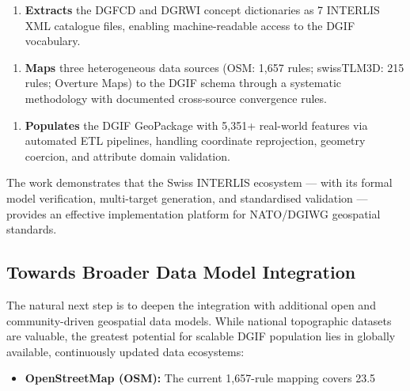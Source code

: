 \documentclass[conference]{IEEEtran}
\begin{document}
\begin{enumerate}[leftmargin=*]
\item \textbf{Extracts} the DGFCD and DGRWI concept dictionaries as 7 INTERLIS XML catalogue files, enabling machine-readable access to the DGIF vocabulary.
\end{enumerate}

\begin{enumerate}[leftmargin=*]
\item \textbf{Maps} three heterogeneous data sources (OSM: 1,657 rules; swissTLM3D: 215 rules; Overture Maps) to the DGIF schema through a systematic methodology with documented cross-source convergence rules.
\end{enumerate}

\begin{enumerate}[leftmargin=*]
\item \textbf{Populates} the DGIF GeoPackage with 5,351+ real-world features via automated ETL pipelines, handling coordinate reprojection, geometry coercion, and attribute domain validation.
\end{enumerate}

The work demonstrates that the Swiss INTERLIS ecosystem — with its formal model verification, multi-target generation, and standardised validation — provides an effective implementation platform for NATO/DGIWG geospatial standards.

\subsection{Towards Broader Data Model Integration}

The natural next step is to deepen the integration with additional open and community-driven geospatial data models. While national topographic datasets are valuable, the greatest potential for scalable DGIF population lies in globally available, continuously updated data ecosystems:

\begin{itemize}[leftmargin=*]
\item \textbf{OpenStreetMap (OSM):} The current 1,657-rule mapping covers 23.5\\%
\end{itemize}
\end{document}
